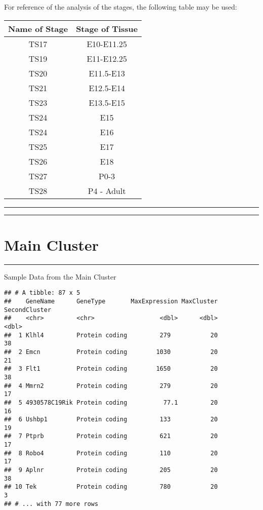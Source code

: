 \documentclass[
]{book}
\begin{document}
For reference of the analysis of the stages, the following table may be used:

\begin{longtable}[]{@{}cc@{}}
\toprule
Name of Stage & Stage of Tissue\tabularnewline
\midrule
\endhead
TS17 & E10-E11.25\tabularnewline
TS19 & E11-E12.25\tabularnewline
TS20 & E11.5-E13\tabularnewline
TS21 & E12.5-E14\tabularnewline
TS23 & E13.5-E15\tabularnewline
TS24 & E15\tabularnewline
TS24 & E16\tabularnewline
TS25 & E17\tabularnewline
TS26 & E18\tabularnewline
TS27 & P0-3\tabularnewline
TS28 & P4 - Adult\tabularnewline
\bottomrule
\end{longtable}

\begin{center}\rule{0.5\linewidth}{0.5pt}\end{center}

\begin{center}\rule{0.5\linewidth}{0.5pt}\end{center}

\hypertarget{main-cluster}{%
\chapter{Main Cluster}\label{main-cluster}}

\begin{center}\rule{0.5\linewidth}{0.5pt}\end{center}

Sample Data from the Main Cluster

\begin{verbatim}
## # A tibble: 87 x 5
##    GeneName      GeneType       MaxExpression MaxCluster SecondCluster
##    <chr>         <chr>                  <dbl>      <dbl>         <dbl>
##  1 Klhl4         Protein coding         279           20            38
##  2 Emcn          Protein coding        1030           20            21
##  3 Flt1          Protein coding        1650           20            38
##  4 Mmrn2         Protein coding         279           20            17
##  5 4930578C19Rik Protein coding          77.1         20            16
##  6 Ushbp1        Protein coding         133           20            19
##  7 Ptprb         Protein coding         621           20            17
##  8 Robo4         Protein coding         110           20            17
##  9 Aplnr         Protein coding         205           20            38
## 10 Tek           Protein coding         780           20             3
## # ... with 77 more rows
\end{verbatim}
\end{document}
